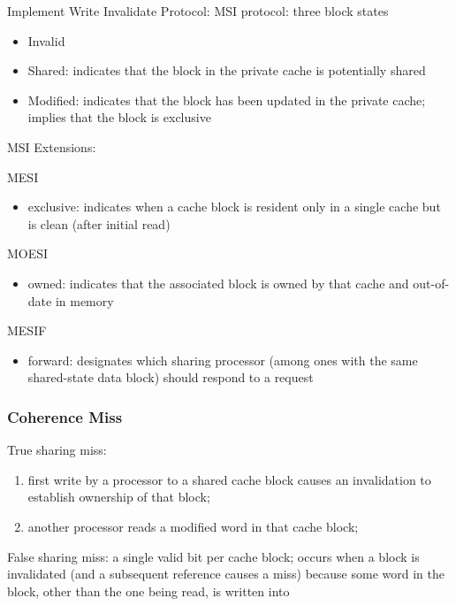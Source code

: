 Implement Write Invalidate Protocol: MSI protocol: three block states
\begin{itemize}
    \item Invalid
    \item Shared: 
    indicates that the block in the private
    cache is potentially shared
    \item Modified: 
    indicates that the block has been
    updated in the private cache;
    implies that the block is exclusive
\end{itemize}



MSI Extensions: 

MESI
\begin{itemize}
    \item exclusive: indicates when a cache
    block is resident only in a single cache
    but is clean (after initial read)
\end{itemize}

MOESI
\begin{itemize}
    \item owned: indicates that the associated
    block is owned by that cache and out-of-date in memory
\end{itemize}


MESIF
\begin{itemize}
    \item forward: designates which sharing
    processor (among ones with the same
    shared-state data block) should respond
    to a request
\end{itemize}

\subsubsection{Coherence Miss}
True sharing miss:
\begin{enumerate}
    \item first write by a processor to
    a shared cache block causes an
    invalidation to establish ownership of
    that block;
    \item another processor reads a
    modified word in that cache block;
\end{enumerate}

False sharing miss:
a single valid bit per cache block;
occurs when a block is invalidated (and
a subsequent reference causes a miss)
because some word in the block, other
than the one being read, is written into



